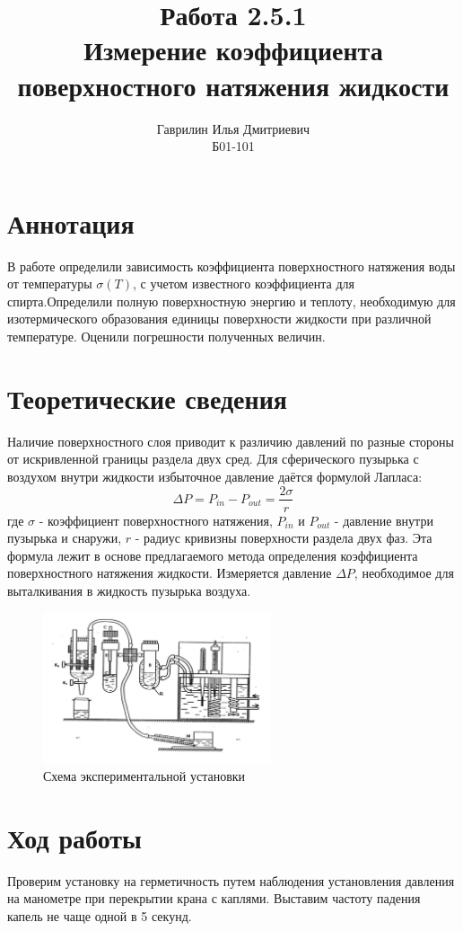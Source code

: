 \documentclass[a4paper, 12pt]{article}%
\author{Гаврилин Илья Дмитриевич \\
	Б01-101}
\title{\textbf{Работа 2.5.1 \\ 
		Измерение коэффициента поверхностного натяжения жидкости}}
\begin{document}
	\maketitle
	\section{Аннотация}
		В работе определили зависимость коэффициента поверхностного натяжения воды от температуры $\sigma(T)$, с учетом известного коэффициента для спирта.Определили полную поверхностную энергию  и теплоту, необходимую для изотермического образования единицы  поверхности жидкости  при различной температуре. Оценили погрешности полученных величин.
	\section{Теоретические сведения}
		Наличие поверхностного слоя приводит к различию давлений по разные стороны от искривленной границы раздела двух сред.  Для сферического пузырька с воздухом  внутри жидкости избыточное давление даётся формулой Лапласа:
		\begin{equation}
			\Delta P = P_{in} - P_{out} = \dfrac{2 \sigma}{r} 
		\end{equation}
		где $\sigma$ - коэффициент поверхностного натяжения, $P_{in}$ и $P_{out}$ - давление внутри пузырька и снаружи, $r$ - радиус кривизны поверхности раздела двух фаз. Эта формула лежит в основе предлагаемого метода определения коэффициента поверхностного натяжения жидкости. Измеряется давление $\Delta P$, необходимое для выталкивания в жидкость пузырька воздуха.
		\begin{figure}[H]
			\centering
			\includegraphics[width = 0.6\textwidth, angle=0.8]{251_1.jpg}
			\caption{Схема экспериментальной установки}
		\end{figure}
	\section{Ход работы}
		Проверим установку на герметичность путем наблюдения установления давления на манометре при перекрытии крана с каплями. Выставим частоту падения капель не чаще одной в 5 секунд.\\
\end{document}
